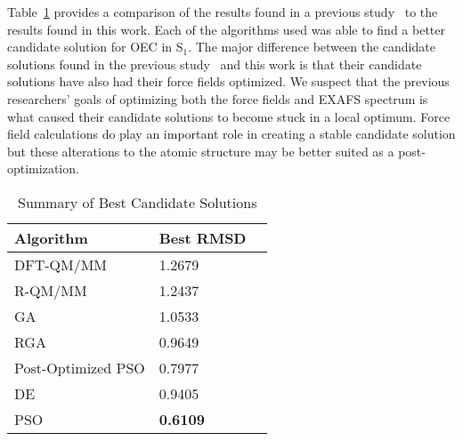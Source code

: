 Table~\ref{fig:summary-rmsd} provides a comparison of the results found in a previous study~\cite{luber2011s1} to the results found in this work. Each of the algorithms used was able to find a better candidate solution for OEC in S$_{1}$. The major difference between the candidate solutions found in the previous study~\cite{luber2011s1} and this work is that their candidate solutions have also had their force fields optimized. We suspect that the previous researchers' goals of optimizing both the force fields and EXAFS spectrum is what caused their candidate solutions to become stuck in a local optimum. Force field calculations do play an important role in creating a stable candidate solution but these alterations to the atomic structure may be better suited as a post-optimization.

\begin{table}
	\centering
	\begin{tabular}{ | l | l | l | }
		\hline
		Algorithm & Best RMSD \\ \hline
		DFT-QM/MM~\cite{luber2011s1} & 1.2679 \\ \hline
		R-QM/MM~\cite{luber2011s1} & 1.2437 \\ \hline
		GA & 1.0533 \\ \hline
		RGA & 0.9649 \\ \hline
		Post-Optimized PSO & 0.7977 \\ \hline
		DE & 0.9405 \\ \hline
		PSO & \textbf{0.6109} \\ \hline
	\end{tabular}
	\caption{Summary of Best Candidate Solutions}
	\label{fig:summary-rmsd}
\end{table}